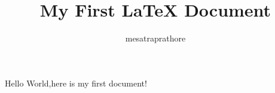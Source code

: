 \documentclass {article}
\begin{document}
\title {My First \LaTeX{ } Document }
\author{mesatraprathore }
\maketitle

Hello World,here is my first document!
\end{document}
